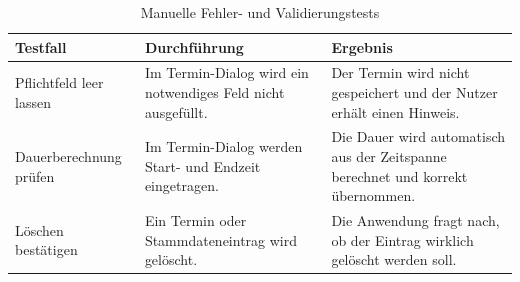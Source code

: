 \documentclass[12pt,a4paper]{article}
\begin{document}
\begin{table}[H]
\centering
\small
\caption{Manuelle Fehler- und Validierungstests}
\label{tab:test-validierung}
\begin{tabularx}{\textwidth}{|L{3cm}|Y|Y|}
\hline
\textbf{Testfall} & \textbf{Durchführung} & \textbf{Ergebnis} \\
\hline
Pflichtfeld leer lassen & Im Termin-Dialog wird ein notwendiges Feld nicht ausgefüllt. & Der Termin wird nicht gespeichert und der Nutzer erhält einen Hinweis. \\
\hline
Dauerberechnung prüfen & Im Termin-Dialog werden Start- und Endzeit eingetragen. & Die Dauer wird automatisch aus der Zeitspanne berechnet und korrekt übernommen. \\
\hline
Löschen bestätigen & Ein Termin oder Stammdateneintrag wird gelöscht. & Die Anwendung fragt nach, ob der Eintrag wirklich gelöscht werden soll. \\
\hline
\end{tabularx}
\end{table}
\end{document}
